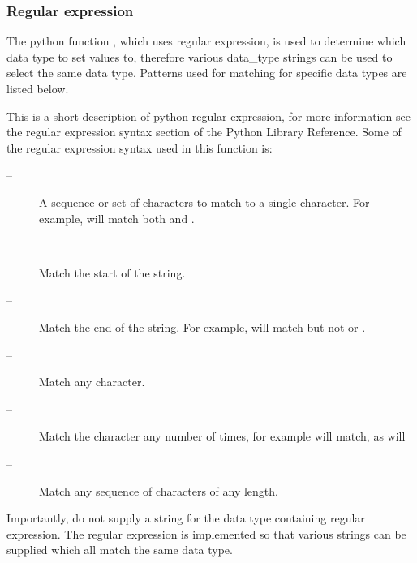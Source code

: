 




\subsubsection{Regular expression}

The python function , which uses regular expression, is used to determine which data type to set values to, therefore various data\_type strings can be used to select the same data type.  Patterns used for matching for specific data types are listed below.


This is a short description of python regular expression, for more information see the regular expression syntax section of the Python Library Reference.  Some of the regular expression syntax used in this function is:


\begin{description}
\item[\quotecmd{[]} --]  A sequence or set of characters to match to a single character.  For example,  will match both  and . 
\item[\quotecmd{\^{}} --]  Match the start of the string. 
\item[\quotecmd{\$} --]  Match the end of the string.  For example,  will match  but not  or . 
\item[ --]  Match any character. 
\item[ --]  Match the character  any number of times, for example  will match, as will  
\item[ --]  Match any sequence of characters of any length. 
\end{description}


Importantly, do not supply a string for the data type containing regular expression.  The regular expression is implemented so that various strings can be supplied which all match the same data type.



